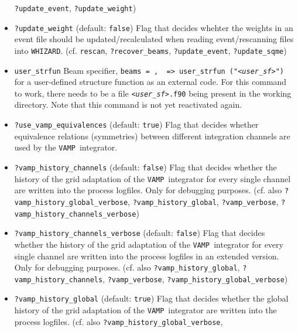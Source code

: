 \documentclass[12pt]{book}
\newcommand{\ttt}[1]{\texttt{#1}}
\newcommand{\whizard}{\texttt{WHIZARD}}
\newcommand{\vamp}{\texttt{VAMP}}
\begin{document}
\begin{itemize}
\ttt{?update\_event}, \ttt{?update\_weight}) 
\item
\ttt{?update\_weight} \qquad (default: \ttt{false}) \newline
Flag that decides whehter the weights in an event file
should be updated/recalculated when reading event/rescanning files
into \whizard. (cf. \ttt{rescan}, \ttt{?recover\_beams},
\newline \ttt{?update\_event}, \ttt{?update\_sqme}) 
\item
{\color{red}
\ttt{user\_strfun} \newline
Beam specifier, \ttt{beams = {\em <b1>}, {\em <b2>} => user\_strfun ("{\em <user\_sf>}")}
for a user-defined structure function as an external code. For this
command to work, there needs to be a file \ttt{{\em <user\_sf>}.f90} being
present in the working directory. Note that this command is not yet
reactivated again. 
}
\item
\ttt{?use\_vamp\_equivalences} \qquad (default: \ttt{true}) \newline
Flag that decides whether equivalence relations (symmetries) between
different integration channels are used by the \vamp\ integrator. 
\item
\ttt{?vamp\_history\_channels} \qquad (default: \ttt{false}) \newline
Flag that decides whether the history of the grid adaptation of
the \vamp\ integrator for every single channel are written into the
process logfiles. Only for debugging purposes.
(cf. also \ttt{?vamp\_history\_global\_verbose},
\ttt{?vamp\_history\_global}, \ttt{?vamp\_verbose},
\newline \ttt{?vamp\_history\_channels\_verbose}) 
\item
\ttt{?vamp\_history\_channels\_verbose} \qquad (default: \ttt{false})
\newline 
Flag that decides whether the history of the grid adaptation of
the \vamp\ integrator for every single channel are written into the
process logfiles in an extended version. Only for debugging purposes.
(cf. also \ttt{?vamp\_history\_global},
\ttt{?vamp\_history\_channels}, \ttt{?vamp\_verbose},
\ttt{?vamp\_history\_global\_verbose}) 
\item
\ttt{?vamp\_history\_global} \qquad (default: \ttt{true}) \newline
Flag that decides whether the global history of the grid adaptation of
the \vamp\ integrator are written into the process logfiles.
(cf. also \ttt{?vamp\_history\_global\_verbose},

\end{itemize}
\end{document}
